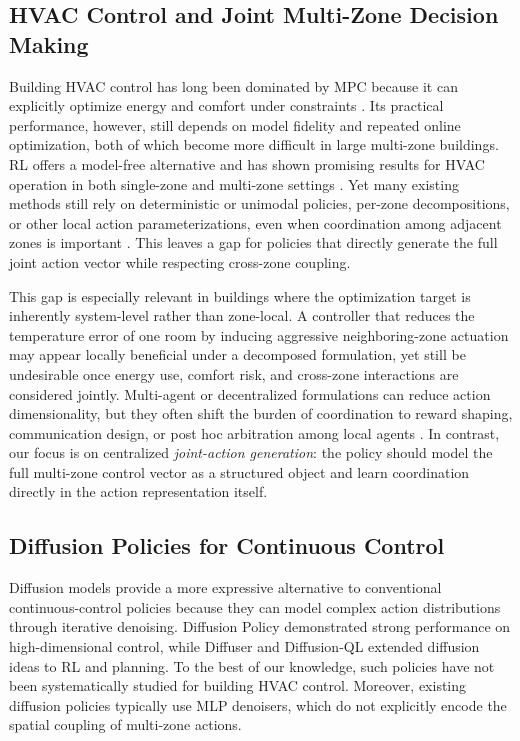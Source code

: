 \documentclass[lettersize,journal]{IEEEtran}
\theoremstyle{nonumberplain}     \theoremheaderfont{\bfseries\itshape}     \theorembodyfont{\normalfont}     \theoremseparator{:}     \theoremsymbol{\ensuremath{\blacksquare}}     \newtheorem{proof}{Proof}
\theoremstyle{plain}     \theoremheaderfont{\bfseries\itshape}     \theorembodyfont{\normalfont}     \theoremseparator{:}     \theoremsymbol{\ensuremath{\blacksquare}}     \newtheorem{remark}{Remark}
\begin{document}
\subsection{HVAC Control and Joint Multi-Zone Decision Making}
Building HVAC control has long been dominated by MPC because it can explicitly optimize energy and comfort under constraints \cite{drgovna2020all}. Its practical performance, however, still depends on model fidelity and repeated online optimization, both of which become more difficult in large multi-zone buildings. RL offers a model-free alternative and has shown promising results for HVAC operation in both single-zone and multi-zone settings \cite{wei2017deep,biemann2021experimental,mason2019review,alsayed2024hvacreview,ding2024multi}. Yet many existing methods still rely on deterministic or unimodal policies, per-zone decompositions, or other local action parameterizations, even when coordination among adjacent zones is important \cite{vazquez2020marlisa,yu2021multiagent,xue2025multi,cui2024energy,fang2023cross,dai2023reinforcement}. This leaves a gap for policies that directly generate the full joint action vector while respecting cross-zone coupling.

This gap is especially relevant in buildings where the optimization target is inherently system-level rather than zone-local. A controller that reduces the temperature error of one room by inducing aggressive neighboring-zone actuation may appear locally beneficial under a decomposed formulation, yet still be undesirable once energy use, comfort risk, and cross-zone interactions are considered jointly. Multi-agent or decentralized formulations can reduce action dimensionality, but they often shift the burden of coordination to reward shaping, communication design, or post hoc arbitration among local agents \cite{vazquez2020marlisa,yu2021multiagent,xue2025multi}. In contrast, our focus is on centralized \emph{joint-action generation}: the policy should model the full multi-zone control vector as a structured object and learn coordination directly in the action representation itself.

\subsection{Diffusion Policies for Continuous Control}
Diffusion models provide a more expressive alternative to conventional continuous-control policies because they can model complex action distributions through iterative denoising. Diffusion Policy \cite{chi2025diffusion} demonstrated strong performance on high-dimensional control, while Diffuser \cite{janner2022planning} and Diffusion-QL \cite{wang2023diffusion} extended diffusion ideas to RL and planning. To the best of our knowledge, such policies have not been systematically studied for building HVAC control. Moreover, existing diffusion policies typically use MLP denoisers, which do not explicitly encode the spatial coupling of multi-zone actions.
\end{document}
